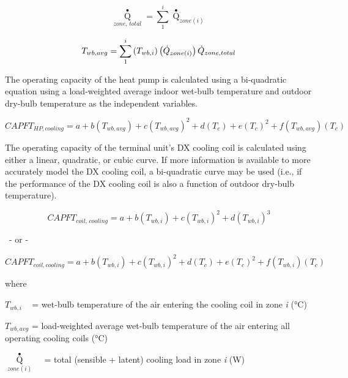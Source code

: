 \begin{equation}
{\mathop Q\limits^ \bullet_{zone,\,total}} = \sum\limits_1^i {{{\mathop Q\limits^ \bullet  }_{zone(i)}}}
\end{equation}

\begin{equation}
  T_{wb,avg} = \sum\limits_1^i {\left(T_{wb,i}\right)} \left(\dot{Q}_{zone(i)}\right){\dot{Q}_{zone,total}}
\end{equation}

The operating capacity of the heat pump is calculated using a bi-quadratic equation using a load-weighted average indoor wet-bulb temperature and outdoor dry-bulb temperature as the independent variables.

\begin{equation}
CAPF{T_{HP,cooling}} = a + b\left( {{T_{wb,avg}}} \right) + c{\left( {{T_{wb,avg}}} \right)^2} + d\left( {{T_c}} \right) + e{\left( {{T_c}} \right)^2} + f\left( {{T_{wb,avg}}} \right)\left( {{T_c}} \right)
\end{equation}

The operating capacity of the terminal unit's DX cooling coil is calculated using either a linear, quadratic, or cubic curve. If more information is available to more accurately model the DX cooling coil, a bi-quadratic curve may be used (i.e., if the performance of the DX cooling coil is also a function of outdoor dry-bulb temperature).

\begin{equation}
CAPF{T_{coil,\,cooling}} = a + b\left( {{T_{wb,i}}} \right) + c{\left( {{T_{wb,i}}} \right)^2} + d{\left( {{T_{wb,i}}} \right)^3}
\end{equation}

~- or -

\begin{equation}
CAPF{T_{coil,cooling}} = a + b\left( {{T_{wb,i}}} \right) + c{\left( {{T_{wb,i}}} \right)^2} + d\left( {{T_c}} \right) + e{\left( {{T_c}} \right)^2} + f\left( {{T_{wb,i}}} \right)\left( {{T_c}} \right)
\end{equation}

where

\({T_{wb,i}}\) ~ = wet-bulb temperature of the air entering the cooling coil in zone \emph{i} (°C)

\({T_{wb,avg}}\) = load-weighted average wet-bulb temperature of the air entering all operating cooling coils (°C)

\({\mathop Q\limits^ \bullet_{zone(i)}}\) ~ = total (sensible + latent) cooling load in zone \emph{i} (W)

